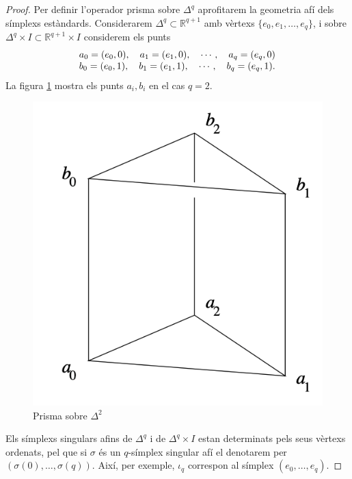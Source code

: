 \documentclass[../main.tex]{subfiles}
\begin{document}
\begin{proof}
Per definir l'operador prisma sobre $\Delta^q$ aprofitarem la geometria afí dels símplexs estàndards. Considerarem $\Delta^q\subset\mathbb{R}^{q+1}$ amb vèrtexs $\{e_0,e_1,\ldots,e_q\}$, i sobre $\Delta^q\times I\subset \mathbb{R}^{q+1}\times I$ considerem els punts
\begin{equation}
    \notag
    \begin{array}{ll}
        a_0 = (e_0,0),\quad a_1 = (e_1,0),\quad\cdots,\quad a_q = (e_q,0)\\
        b_0 = (e_0,1),\quad b_1 = (e_1,1),\quad\cdots,\quad b_q = (e_q,1).
    \end{array}
\end{equation}
La figura \ref{fig:prismasobredelta2} mostra els punts $a_i,b_i$ en el cas $q = 2$.
\begin{figure}
    \centering
    \includegraphics[scale = 0.25]{pictures/prismasobredelta2.png}
    \caption{Prisma sobre $\Delta^2$}
    \label{fig:prismasobredelta2}
\end{figure}

Els símplexs singulars afins de $\Delta^q$ i de $\Delta^q\times I$ estan determinats pels seus vèrtexs ordenats, pel que si $\sigma$ és un $q$-símplex singular afí el denotarem per $(\sigma(0),\ldots,\sigma(q))$. Així, per exemple, $\iota_q$ correspon al símplex $(e_0,\ldots,e_q)$. 


\end{proof}
\end{document}
